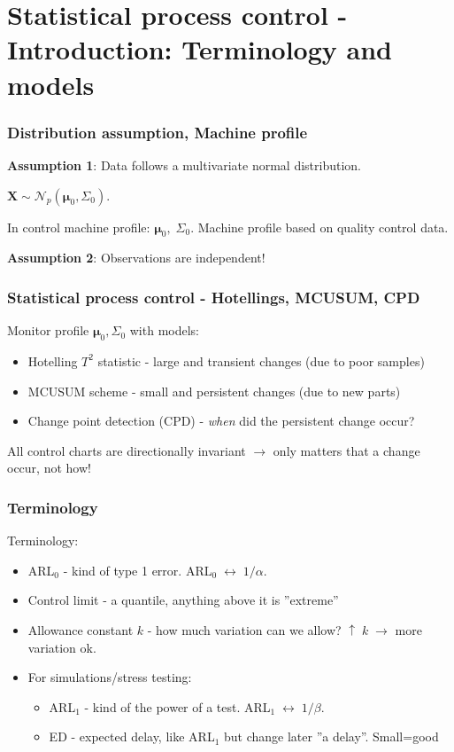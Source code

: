 \documentclass[10pt]{beamer}\usepackage[]{graphicx}\usepackage[]{color}
\begin{document}

\section[SPC - models]{Statistical process control - Introduction: Terminology and models}

\begin{frame}\frametitle{Distribution assumption, Machine profile}
\textbf{Assumption 1}: Data follows a multivariate normal distribution.
\begin{center}
$\mathbf{X} \sim \mathcal{N}_p(\boldsymbol{\mu}_0, \Sigma_0)$.
\end{center}
In control machine profile: $\boldsymbol{\mu}_0,\; \Sigma_0$. Machine profile based on quality control data.

\textbf{Assumption 2}: Observations are independent!
\end{frame}

\begin{frame}\frametitle{Statistical process control - Hotellings, MCUSUM, CPD}
Monitor profile $\boldsymbol{\mu}_0, \Sigma_0$ with models:
 \begin{itemize}
 \item Hotelling $T^2$ statistic - large and transient changes (due to poor samples)
 \item MCUSUM scheme - small and persistent changes (due to new parts)
 \item Change point detection (CPD) - \textit{when} did the persistent change occur?
 \end{itemize}
All control charts are directionally invariant $\rightarrow$ only matters that a change occur, not how! 
\end{frame}

\begin{frame}\frametitle{Terminology}
Terminology:
 \begin{itemize}
 \item ARL$_0$ - kind of type 1 error. ARL$_0 \; \leftrightarrow \; 1/\alpha$.
 \item Control limit - a quantile, anything above it is ''extreme''
 \item Allowance constant $k$ - how much variation can we allow? $\uparrow\; k\; \rightarrow$ more variation ok.
 \item For simulations/stress testing:
 \begin{itemize}
 \item ARL$_1$ - kind of the power of a test. ARL$_1 \; \leftrightarrow \; 1/\beta$.
 \item ED - expected delay, like ARL$_1$ but change later ''a delay''. Small=good
 \end{itemize}
 \end{itemize}
 \end{frame}
\end{document}
